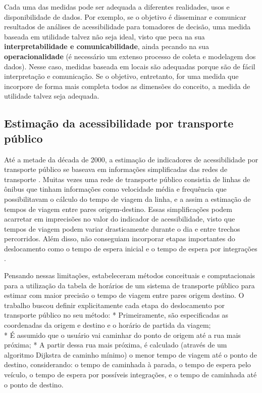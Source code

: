 \documentclass[        
    a4paper,          %
    12pt,             %
    chapter=TITLE,    %
    section=Title,    %
    subsection=Title, %
    oneside,          %
    english,          %
    spanish,          %
    brazil,           %
    fleqn             %
]{abntex2}
\begin{document}
  Cada uma das medidas pode ser adequada a diferentes realidades, usos e disponibilidade de dados. Por exemplo, se o objetivo é disseminar e comunicar resultados de análises de acessibilidade para tomadores de decisão, uma medida baseada em utilidade talvez não seja ideal, visto que peca na sua \textbf{interpretabilidade e comunicabilidade}, ainda pecando na sua \textbf{operacionalidade} (é necessário um extenso processo de coleta e modelagem dos dados). Nesse caso, medidas baseada em locais são adequadas porque são de fácil interpretação e comunicação. Se o objetivo, entretanto, for uma medida que incorpore de forma mais completa todos as dimensões do conceito, a medida de utilidade talvez seja adequada.
  
  \hypertarget{estimacao-da-acessibilidade-por-transporte-publico}{%
  \subsection{Estimação da acessibilidade por transporte público}\label{estimacao-da-acessibilidade-por-transporte-publico}}
  
  Até a metade da década de 2000, a estimação de indicadores de acessibilidade por transporte público se baseava em informações simplificadas das redes de transporte \citep{Owen2015}. Muitas vezes uma rede de transporte público consistia de linhas de ônibus que tinham informações como velocidade média e frequência que possibilitavam o cálculo do tempo de viagem da linha, e a assim a estimação de tempos de viagem entre pares origem-destino. Essas simplificações podem acarretar em imprecisões no valor do indicador de acessibilidade, visto que tempos de viagem podem variar drasticamente durante o dia e entre trechos percorridos. Além disso, não conseguiam incorporar etapas importantes do deslocamento como o tempo de espera inicial e o tempo de espera por integrações \citep{Lei2010}.
  
  Pensando nessas limitações, \citet{Lei2010} estabeleceram métodos conceituais e computacionais para a utilização da tabela de horários de um sistema de transporte público para estimar com maior precisão o tempo de viagem entre pares origem destino. O trabalho buscou definir explicitamente cada etapa do deslocamento por transporte público no seu método:
  * Primeiramente, são especificadas as coordenadas da origem e destino e o horário de partida da viagem;\\
  * É assumido que o usuário vai caminhar do ponto de origem até a rua mais próxima;
  * A partir dessa rua mais próxima, é calculado (através de um algoritmo Dijkstra de caminho mínimo) o menor tempo de viagem até o ponto de destino, considerando: o tempo de caminhada à parada, o tempo de espera pelo veículo, o tempo de espera por possíveis integrações, e o tempo de caminhada até o ponto de destino.
  
\end{document}
